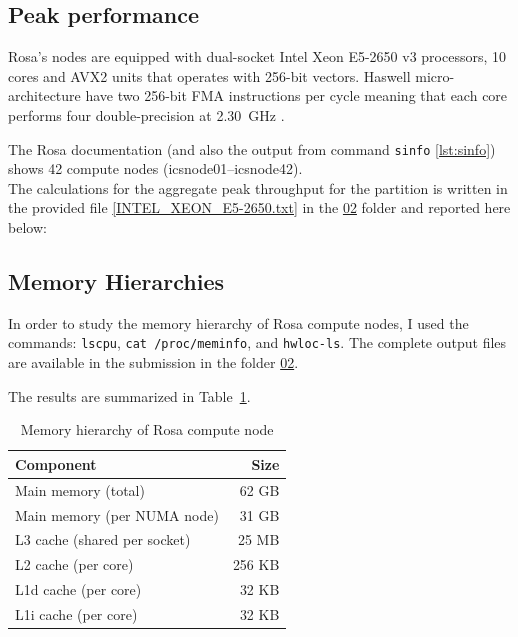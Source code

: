 \subsection{Peak performance}
\label{subsec:peak_fp}
Rosa's nodes are equipped with dual-socket Intel Xeon E5-2650 v3 processors, 10 cores and AVX2 units that operates with 256-bit vectors\cite{intel-e5-2650v3,usi-rosa-hardware}. Haswell micro-architecture have two 256-bit FMA instructions per cycle meaning that each core performs four double-precision at 2.30~GHz \cite{intel-optimization-manual}.

The Rosa documentation (and also the output from command \texttt{sinfo} \ref{lst:sinfo}) shows 42 compute nodes (icsnode01--icsnode42).\cite{usi-rosa-hardware} \\ 
The calculations for the aggregate peak throughput for the partition is written in the provided file \href{run:../src/2-Performance-characteristics/01/INTEL_XEON_E5-2650.txt}{[INTEL\_XEON\_E5-2650.txt]} in the \href{run:../src/2-Performance-characteristics/02/}{02} folder and reported here below:




\subsection{Memory Hierarchies}
\label{subsec:memory_hierarchy}

In order to study the memory hierarchy of Rosa compute nodes, I used the commands: \texttt{lscpu}, \texttt{cat /proc/meminfo}, and \texttt{hwloc-ls}. The complete output files are available in the submission in the folder \href{run:../src/2-Performance-characteristics/02/}{02}.

The results are summarized in Table~\ref{tab:memory_hierarchy}.

\begin{table}[h]
    \centering
    \begin{tabular}{|l|r|}
    \hline
    \textbf{Component} & \textbf{Size} \\
    \hline
    Main memory (total) & 62 GB \\
    Main memory (per NUMA node) & 31 GB \\
    L3 cache (shared per socket) & 25 MB \\
    L2 cache (per core) & 256 KB \\
    L1d cache (per core) & 32 KB \\
    L1i cache (per core) & 32 KB \\
    \hline
    \end{tabular}
    \caption{Memory hierarchy of Rosa compute node}
    \label{tab:memory_hierarchy}
\end{table}

